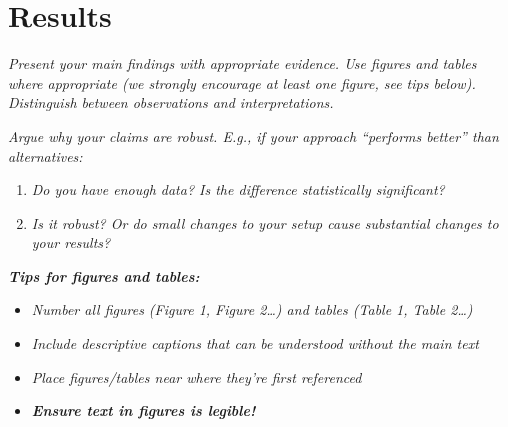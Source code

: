 \documentclass[11pt,letterpaper]{article}
\newcommand{\guide}[1]{\textit{#1}}
\begin{document}
\section{Results}

\guide{Present your main findings with appropriate evidence. Use figures and
tables where appropriate (we strongly encourage at least one figure, see tips
below). Distinguish between observations and interpretations.}

\guide{Argue why your claims are robust. E.g., if your approach ``performs
better'' than alternatives:}
\begin{enumerate}[label=(\alph*)]
  \item \guide{Do you have enough data? Is the difference statistically
        significant?}
  \item \guide{Is it robust? Or do small changes to your setup cause substantial
        changes to your results?}
\end{enumerate}



\textbf{\textit{Tips for figures and tables:}}
\begin{itemize}
  \item \guide{Number all figures (Figure 1, Figure 2\ldots) and tables
        (Table 1, Table 2\ldots)}
  \item \guide{Include descriptive captions that can be understood without the
        main text}
  \item \guide{Place figures/tables near where they're first referenced}
  \item \textbf{\textit{Ensure text in figures is legible!}}
\end{itemize}
\end{document}
